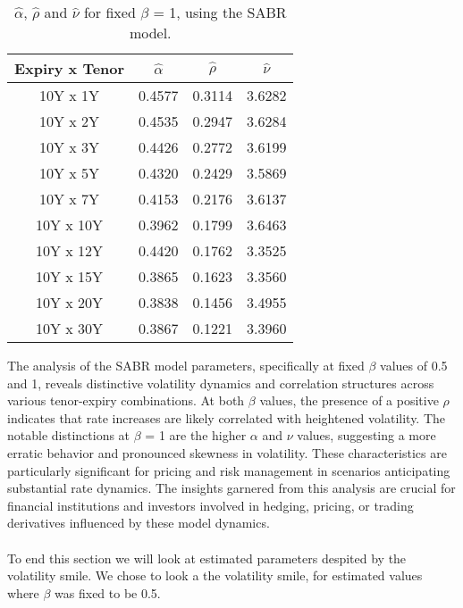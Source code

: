 \begin{table}[H]
    \centering
    \begin{tabular}{cccc}
      \toprule
      \textbf{Expiry x Tenor} & \textbf{$\hat{\alpha}$} & \textbf{$\hat{\rho}$}  & \textbf{$\hat{\nu}$}\\
      \midrule
      \rowcolor{lightgray!40} 10Y x 1Y &0.4577 & 0.3114 & 3.6282 \\
      10Y x 2Y  &0.4535 & 0.2947 & 3.6284 \\
      \rowcolor{lightgray!40} 10Y x 3Y  &0.4426 & 0.2772 & 3.6199\\
      10Y x 5Y  &0.4320 & 0.2429 & 3.5869 \\
      \rowcolor{lightgray!40} 10Y x 7Y  &0.4153 & 0.2176 & 3.6137 \\
      10Y x 10Y &0.3962& 0.1799 & 3.6463 \\
      \rowcolor{lightgray!40} 10Y x 12Y &0.4420 & 0.1762 & 3.3525\\
      10Y x 15Y & 0.3865 & 0.1623 & 3.3560 \\
      \rowcolor{lightgray!40} 10Y x 20Y &0.3838 & 0.1456 & 3.4955 \\
      10Y x 30Y &0.3867 & 0.1221 & 3.3960 \\
      \bottomrule
    \end{tabular}
    \caption{$\hat{\alpha}$, $\hat{\rho}$ and $\hat{\nu}$ for fixed $\beta$ = 1, using the SABR model.}
    \label{tab:beta_1}
\end{table}
\noindent
\newpage
\noindent
The analysis of the SABR model parameters, specifically at fixed $\beta$ values of 0.5 and 1, 
reveals distinctive volatility dynamics and correlation structures across various tenor-expiry combinations. 
At both $\beta$ values, the presence of a positive $\rho$ indicates that rate increases are likely correlated with heightened volatility.
The notable distinctions at $\beta$ = 1 are the higher $\alpha$ and $\nu$ values, suggesting a more erratic behavior and pronounced 
skewness in volatility. These characteristics are particularly significant for pricing and risk management in scenarios 
anticipating substantial rate dynamics. The insights garnered from this analysis are crucial for financial institutions and 
investors involved in hedging, pricing, or trading derivatives influenced by these model dynamics.
\\\\
To end this section we will look at estimated parameters despited by the volatility smile. 
We chose to look a the volatility smile, for estimated values where $\beta$ was fixed to be 0.5. 
